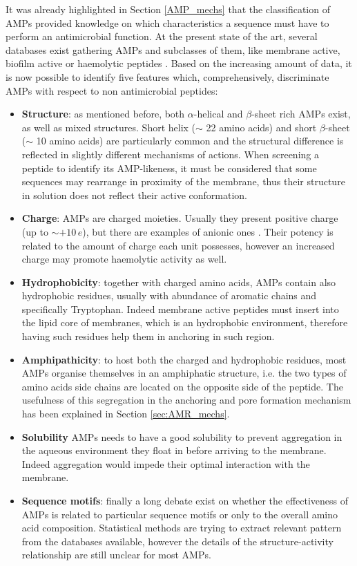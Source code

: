 It was already highlighted in Section \ref{AMP_mechs} that the classification of AMPs provided knowledge on which characteristics a sequence must have to perform an antimicrobial function.
%
At the present state of the art, several databases exist gathering AMPs and subclasses of them, like membrane active, biofilm active or haemolytic  peptides \cite{???}. Based on the increasing amount of data, it is now possible to identify five features which, comprehensively, discriminate AMPs with respect to non antimicrobial peptides:
%
\begin{itemize}
\item \textbf{Structure}: as mentioned before, both $\alpha$-helical and $\beta$-sheet rich AMPs exist, as well as mixed structures. Short helix ($\sim$ 22 amino acids) \cite{???} and short $\beta$-sheet ($\sim$ 10 amino acids) \cite{???} are particularly common and the structural difference is reflected in slightly different mechanisms of actions. When screening a peptide to identify its AMP-likeness, it must be considered that some sequences may rearrange in proximity of the membrane, thus their structure in solution does not reflect their active conformation.
\item \textbf{Charge}: AMPs are charged moieties. Usually they present positive charge (up to $\sim + 10\,e$), but there are examples of anionic ones \cite{???see_example_on_AMPR}. Their potency is related to the amount of charge each unit possesses, however an increased charge may promote haemolytic activity as well. \cite{???}
\item \textbf{Hydrophobicity}: together with charged amino acids, AMPs contain also hydrophobic residues, usually with abundance of aromatic chains and specifically Tryptophan. Indeed membrane active peptides must insert into the lipid core of membranes, which is an hydrophobic environment, therefore having such residues help them in anchoring in such region.
\item \textbf{Amphipathicity}: to host both the charged and hydrophobic residues, most AMPs organise themselves in an amphiphatic structure, i.e. the two types of amino acids side chains are located on the opposite side of the peptide. The usefulness of this segregation in the anchoring and pore formation mechanism has been explained in Section \ref{sec:AMR_mechs}.
\item \textbf{Solubility} AMPs needs to have a good solubility to prevent aggregation in the aqueous environment they float in before arriving to the membrane. Indeed aggregation would impede their optimal interaction with the membrane.
\item \textbf{Sequence motifs}: finally a long debate exist on whether the effectiveness of AMPs is related to particular sequence motifs or only to the overall amino acid composition. Statistical methods are trying to extract relevant pattern from the databases available, however the details of the structure-activity relationship are still unclear for most AMPs.
\end{itemize}
